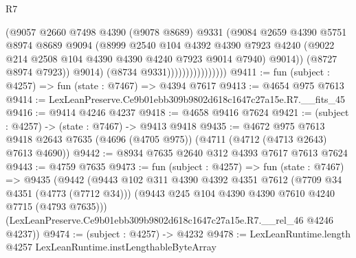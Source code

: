 \begin{lexlean}{R7}
\begin{coremodule}
                                    (@9057
                                      @2660
                                      @7498
                                      @4390
                                      (@9078 @8689)
                                      @9331
                                      (@9084
                                        @2659
                                        @4390
                                        @5751
                                        @8974
                                        @8689
                                        @9094
                                        (@8999
                                          @2540
                                          @104
                                          @4392
                                          @4390
                                          @7923
                                          @4240
                                          (@9022
                                            @214
                                            @2508
                                            @104
                                            @4390
                                            @4390
                                            @4240
                                            @7923
                                            @9014
                                            @7940)
                                          @9014))
                                      (@8727 @8974 @7923))
                                    @9014)
                                  (@8734 @9331))))))))))))))))
@9411 := fun (subject : @4257) => fun (state : @7467) => @4394 @7617
@9413 := @4654 @975 @7613
@9414 := LexLeanPreserve.Ce9b01ebb309b9802d618c1647c27a15e.R7.__fits_45
@9416 := @9414 @4246 @4237
@9418 := @4658 @9416 @7624
@9421 := (subject : @4257) -> (state : @7467) -> @9413 @9418
@9435 := @4672
    @975
    @7613
    @9418
    @2643
    @7635
    (@4696 (@4705 @975))
    (@4711 (@4712 (@4713 @2643) @7613 @4690))
@9442 := @8934 @7635 @2640 @312 @4393 @7617 @7613 @7624
@9443 := @4759 @7635
@9473 := fun (subject : @4257) =>
  fun (state : @7467) =>
  @9435
    (@9442
      (@9443
        @102
        @311
        @4390
        @4392
        @4351
        @7612
        (@7709 @34 @4351 (@4773 (@7712 @34)))
        (@9443 @245 @104 @4390 @4390 @7610 @4240 @7715 (@4793 @7635)))
      (LexLeanPreserve.Ce9b01ebb309b9802d618c1647c27a15e.R7.__rel_46 @4246 @4237))
@9474 := (subject : @4257) -> @4232
@9478 := LexLeanRuntime.length @4257 LexLeanRuntime.instLengthableByteArray

\end{coremodule}
\end{lexlean}
